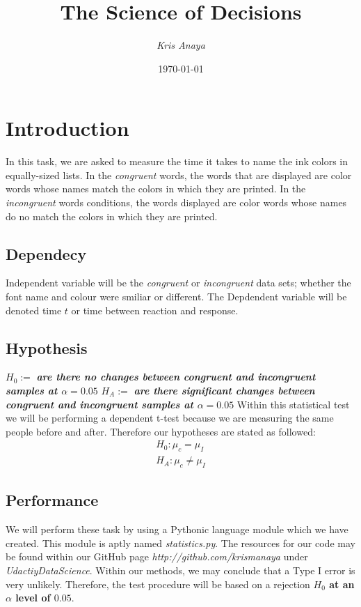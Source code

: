\documentclass[8pt]{article}
\newcommand{\8}{\bar}
\begin{document}
 
\title{The Science of Decisions} 
\author{\textit{Kris Anaya}}
\date{\today} 
\maketitle

\section{Introduction}
In this task, we are asked to measure the time it takes to name the ink colors in equally-sized lists. In the \textit{congruent} words, the words that are displayed are color words whose names match the colors in which they are printed. In the \textit{incongruent} words conditions, the words displayed are color words whose names do no match the colors in which they are printed.
\subsection{Dependecy} 
Independent variable will be the \textit{congruent} or \textit{incongruent} data sets; whether the font name and colour were smiliar or different. The Depdendent variable will be denoted time $t$ or time between reaction and response. 
\subsection{Hypothesis} 
$H_{0} :=$ \textbf{\textit{are there no changes between \textit{congruent} and \textit{incongruent} samples at $\alpha =0.05$}} \newline
$H_{A} :=$ \textbf{\textit{are there significant changes between \textit{congruent} and \textit{incongruent} samples at $\alpha = 0.05$}} 
Within this statistical test we will be performing a dependent t-test because we are measuring the same people before and after. Therefore our hypotheses are stated as followed: 
\begin{equation} 
\begin{split} 
H_{0}: \mu_{c} = \mu_{I} \\
H_{A}: \mu_{c} \not= \mu_{I} 
\end{split}
\end{equation} 
\subsection{Performance} 
\noindent We will perform these task by using a Pythonic language module which we have created. This module is aptly named \textit{statistics.py}. 
The resources for our code may be found within our GitHub page \textit{http://github.com/krismanaya} under \textit{UdactiyDataScience}.  Within our methods, we may conclude that a Type I error is very unlikely. Therefore, the test procedure will be based on a rejection \textbf{$H_{0}$ at an $\alpha$ level of $0.05$}. 
\end{document}
